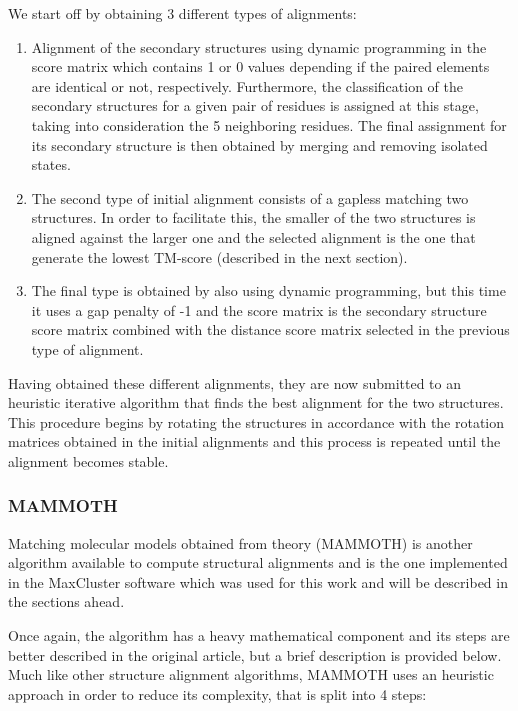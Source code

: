 We start off by obtaining 3 different types of alignments:

\begin{enumerate}
	\item Alignment of the secondary structures using dynamic programming in the score matrix which contains 1 or 0 values depending if the paired elements are identical or not, respectively. Furthermore, the classification of the secondary structures for a given pair of residues is assigned at this stage, taking into consideration the 5 neighboring residues. The final assignment for its secondary structure is then obtained by merging and removing isolated states.
	
	\item The second type of initial alignment consists of a gapless matching two structures. In order to facilitate this, the smaller of the two structures is aligned against the larger one and the selected alignment is the one that generate the lowest TM-score (described in the next section).
	
	\item The final type is obtained by also using dynamic programming, but this time it uses a gap penalty of -1 and the score matrix is the secondary structure score matrix combined with the distance score matrix selected in the previous type of alignment.
\end{enumerate}

Having obtained these different alignments, they are now submitted to an heuristic iterative algorithm that finds the best alignment for the two structures. This procedure begins by rotating the structures in accordance with the rotation matrices obtained in the initial alignments and this process is repeated until the alignment becomes stable.

\subsubsection{MAMMOTH}

Matching molecular models obtained from theory (MAMMOTH) \cite{ortiz2002mammoth} is another algorithm available to compute structural alignments and is the one implemented in the MaxCluster software which was used for this work and will be described in the sections ahead.

Once again, the algorithm has a heavy mathematical component and its steps are better described in the original article, but a brief description is provided below. Much like other structure alignment algorithms, MAMMOTH uses an heuristic approach in order to reduce its complexity, that is split into 4 steps:


